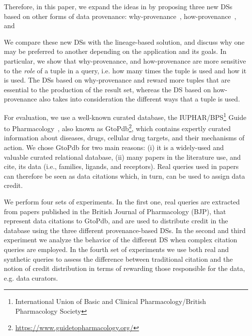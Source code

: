 Therefore, in this paper, we expand the ideas in \citep{dosso2020data} by proposing three new DSs based on other forms of data provenance: why-provenance~\citep{WhyProvBuneman}, how-provenance~\citep{howProvenanceGreen}, and  

We compare these new DSs with the lineage-based solution, and discuss why one may be preferred to another depending on the application and its goals. 
In particular, we show that why-provenance,  and how-provenance are more sensitive to the {\em role} of a tuple in a query, i.e. how many times the tuple is used and how it is used. 
The DSs based on why-provenance and  reward more tuples that are essential to the production of the result set, whereas the DS based on how-provenance also takes into consideration the different ways that a tuple is used. 

For evaluation, we use a well-known curated database, the IUPHAR/BPS\footnote{International Union of Basic and Clinical Pharmacology/British Pharmacology Society} Guide to Pharmacology~\citep{iuphar2018}, also known as GtoPdb\footnote{\url{https://www.guidetopharmacology.org/}}, which contains expertly curated information about diseases, drugs, cellular drug targets, and their mechanisms of action.
We chose GtoPdb for two main reasons: (i) it is a widely-used and valuable curated relational database, (ii) many papers in the literature use, and cite, its data (i.e., families, ligands, and receptors). 
Real queries used in papers can therefore be seen as data citations which, in turn, can be used to assign data credit.

We perform four sets of experiments. In the first one, real queries are extracted from papers published in the British Journal of Pharmacology (BJP), that represent data citations to GtoPdb, and are used to distribute credit in the database using the three different provenance-based DSs. 
In the second and third experiment we analyze the behavior of the different DS when complex citation queries are employed.
In the fourth set of experiments we use both real and synthetic queries to assess the difference between traditional citation and the notion of credit distribution in terms of rewarding those responsible for the data, e.g. data curators.

